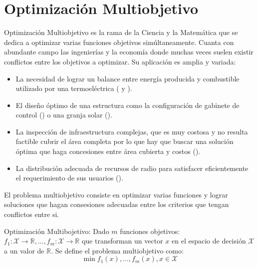 \section{Optimizaci\'on Multiobjetivo}\label{background:moo}
Optimizaci\'on Multiobjetivo es la rama de la Ciencia y la Matem\'atica que se dedica a optimizar varias funciones objetivos sim\'ultaneamente. Cuanta con abundante campo las ingenier\'ias y la econom\'ia donde muchas veces suelen existir conflictos entre los objetivos a optimizar. Su aplicaci\'on es amplia y variada: 
\begin{itemize}
    \item La necesidad de lograr un balance entre energ\'ia producida y combustible utilizado por una termoel\'ectrica (\cite{shirazi2012thermal} y \cite{shirazi2014thermal}).
    \item El dise\~no \'optimo de una estructura como la configuraci\'on de gabinete de control (\cite{pllana2019customizing}) o una granja solar (\cite{ganesan2013hypervolume}).
    \item La inspecci\'on de infraestructura complejas, que es muy costosa y no resulta factible cubrir el \'area completa por lo que hay que buscar una soluci\'on \'optima que haga concesiones entre \'area cubierta y costos (\cite{ellefsen2017multiobjective}).
    \item La distribuci\'on adecuada de recursos de radio para satisfacer eficientemente el requerimiento de sus usuarios (\cite{bjornson2013optimal}).
\end{itemize}

El problema multiobjetivo consiste en optimizar varias funciones y lograr soluciones que hagan consesiones adecuadas entre los criterios que tengan conflictos entre si.
\begin{definition}{Optimizaci\'on Multibojetivo:}
    \label{background:def:moo}
     Dado $m$ funciones objetivos: $f_1: \mathcal{X} \rightarrow \mathbb{R}, ..., f_m: \mathcal{X} \rightarrow \mathbb{R}$ que transforman un vector $x$ en el espacio de decisi\'on $\mathcal{X}$ a un valor de $\mathbb{R}$. Se define el problema multiobjetivo como:
    \begin{equation*}
        \min f_1(x), ..., f_m(x), x \in \mathcal{X}
    \end{equation*}
\end{definition}

